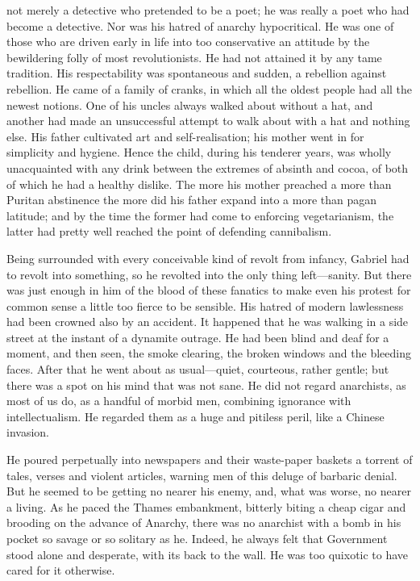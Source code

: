  not merely a detective who pretended to be a poet; he was really a poet who had become a detective. Nor was his hatred of anarchy hypocritical. He was one of those who are driven early in life into too conservative an attitude by the bewildering folly of most revolutionists. He had not attained it by any tame tradition. His respectability was spontaneous and sudden, a rebellion against rebellion. He came of a family of cranks, in which all the oldest people had all the newest notions. One of his uncles always walked about without a hat, and another had made an unsuccessful attempt to walk about with a hat and nothing else. His father cultivated art and self-realisation; his mother went in for simplicity and hygiene. Hence the child, during his tenderer years, was wholly unacquainted with any drink between the extremes of absinth and cocoa, of both of which he had a healthy dislike. The more his mother preached a more than Puritan abstinence the more did his father expand into a more than pagan latitude; and by the time the former had come to enforcing vegetarianism, the latter had pretty well reached the point of defending cannibalism.

Being surrounded with every conceivable kind of revolt from infancy, Gabriel had to revolt into something, so he revolted into the only thing left⁠—sanity. But there was just enough in him of the blood of these fanatics to make even his protest for common sense a little too fierce to be sensible. His hatred of modern lawlessness had been crowned also by an accident. It happened that he was walking in a side street at the instant of a dynamite outrage. He had been blind and deaf for a moment, and then seen, the smoke clearing, the broken windows and the bleeding faces. After that he went about as usual⁠—quiet, courteous, rather gentle; but there was a spot on his mind that was not sane. He did not regard anarchists, as most of us do, as a handful of morbid men, combining ignorance with intellectualism. He regarded them as a huge and pitiless peril, like a Chinese invasion.

He poured perpetually into newspapers and their waste-paper baskets a torrent of tales, verses and violent articles, warning men of this deluge of barbaric denial. But he seemed to be getting no nearer his enemy, and, what was worse, no nearer a living. As he paced the Thames embankment, bitterly biting a cheap cigar and brooding on the advance of Anarchy, there was no anarchist with a bomb in his pocket so savage or so solitary as he. Indeed, he always felt that Government stood alone and desperate, with its back to the wall. He was too quixotic to have cared for it otherwise.

